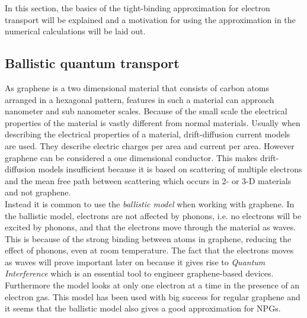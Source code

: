 In this section, the basics of the tight-binding approximation for electron transport will be explained and a motivation for using the approximation in the numerical calculations will be laid out.
\subsection{Ballistic quantum transport}
As graphene is a two dimensional material that consists of carbon atoms arranged in a hexagonal pattern, features in such a material can approach nanometer and sub nanometer scales. Because of the small scale the electrical properties of the material is vastly different from normal materials. Usually when describing the electrical properties of a material, drift-diffusion current models are used. They describe electric charges per area and current per area. However graphene can be considered a one dimensional conductor. This makes drift-diffusion models insufficient because it is based on scattering of multiple electrons and the mean free path between scattering which occurs in 2- or 3-D materials and not graphene. \\
Instead it is common to use the \textit{ballistic model} when working with graphene. In the ballistic model, electrons are not affected by phonons, i.e. no electrons will be excited by phonons, and that the electrons move through the material as waves. This is because of the strong binding between atoms in graphene, reducing the effect of phonons, even at room temperature. The fact that the electrons moves as waves will prove important later on because it gives rise to \textit{Quantum Interference} which is an essential tool to engineer graphene-based devices. Furthermore the model looks at only one electron at a time in the presence of an electron gas. This model has been used with big success for regular graphene and it seems that the ballistic model also gives a good approximation for NPGs.
